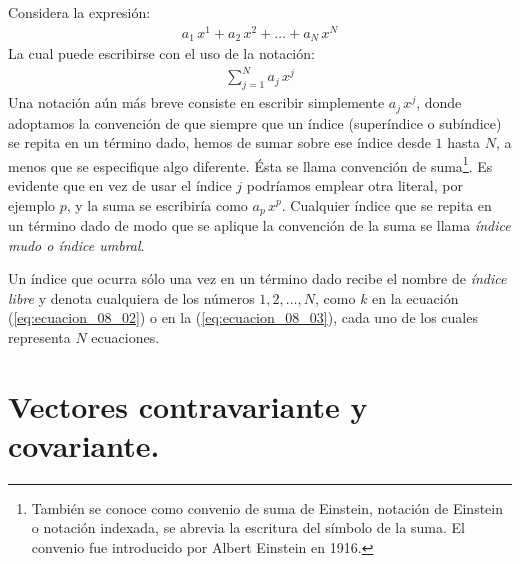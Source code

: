 Considera la expresión:
\begin{align*}
a_{1} \, x^{1} + a_{2} \, x^{2} + \ldots + a_{N} \, x^{N}
\end{align*}
La cual puede escribirse con el uso de la notación:
\begin{align*}
\sum_{j=1}^{N} a_{j} \, x^{j}
\end{align*}
Una notación aún más breve consiste en escribir simplemente $a_{j} \, x^{j}$, donde adoptamos la convención de que siempre que un índice (superíndice o subíndice) se repita en un término dado, hemos de sumar sobre ese índice desde $1$ hasta $N$, a menos que se especifique algo diferente. Ésta se llama convención de suma\footnote{También se conoce como convenio de suma de Einstein, notación de Einstein o notación indexada, se abrevia la escritura del símbolo de la suma. El convenio fue introducido por Albert Einstein en 1916.}. Es evidente que en vez de usar el índice $j$ podríamos emplear otra literal, por ejemplo $p$, y la suma se escribiría como $a_{p} \, x^{p}$. Cualquier índice que se repita en un término dado de modo que se aplique la convención de la suma se llama \emph{índice mudo o índice umbral}.
\par
Un índice que ocurra sólo una vez en un término dado recibe el nombre de \emph{índice libre} y denota cualquiera de los números $1, 2, \ldots, N$, como $k$ en la ecuación (\ref{eq:ecuacion_08_02}) o en la (\ref{eq:ecuacion_08_03}), cada uno de los cuales representa $N$ ecuaciones.

\section{Vectores contravariante y covariante.}

